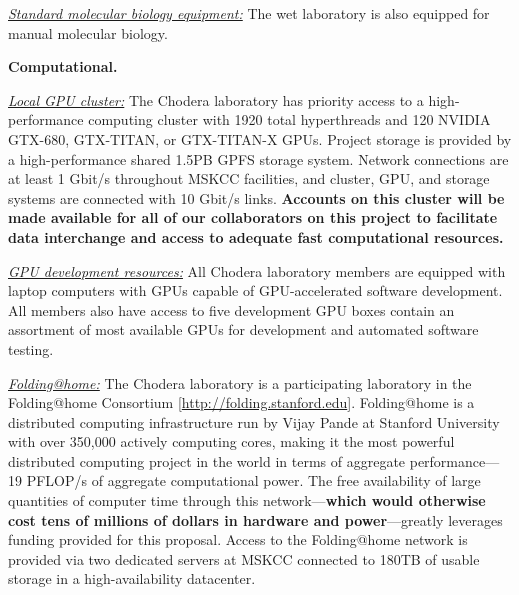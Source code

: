 \documentclass[11pt]{article}
\begin{document}
\underline{\emph{Standard molecular biology equipment:}} The wet laboratory is also equipped for manual molecular biology.

{\bf Computational.}

\underline{\emph{Local GPU cluster:}} 
The Chodera laboratory has priority access to a high-performance computing cluster with 1920 total hyperthreads and 120 NVIDIA GTX-680, GTX-TITAN, or GTX-TITAN-X GPUs.
Project storage is provided by a high-performance shared 1.5PB GPFS storage system.
Network connections are at least 1 Gbit/s throughout MSKCC facilities, and cluster, GPU, and storage systems are connected with 10 Gbit/s links.
{\bf Accounts on this cluster will be made available for all of our collaborators on this project to facilitate data interchange and access to adequate fast computational resources.}

\underline{\emph{GPU development resources:}} All Chodera laboratory members are equipped with laptop computers with GPUs capable of GPU-accelerated software development.
All members also have access to five development GPU boxes contain an assortment of most available GPUs for development and automated software testing.

\underline{\emph{Folding@home:}} The Chodera laboratory is a participating laboratory in the Folding@home Consortium [\url{http://folding.stanford.edu}].
Folding@home is a distributed computing infrastructure run by Vijay Pande at Stanford University with over 350,000 actively computing cores, making it the most powerful distributed computing project in the world in terms of aggregate performance---19 PFLOP/s of aggregate computational power.  
The free availability of large quantities of computer time through this network---{\bf which would otherwise cost tens of millions of dollars in hardware and power}---greatly leverages funding provided for this proposal.
Access to the Folding@home network is provided via two dedicated servers at MSKCC connected to 180TB of usable storage in a high-availability datacenter.



%
%
%
%
\end{document}

